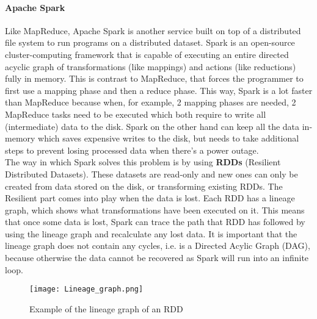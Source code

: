 \paragraph{Apache Spark}
Like MapReduce, Apache Spark is another service built on top of a distributed file system to run programs on a distributed dataset. Spark is an open-source cluster-computing framework that is capable of executing an entire directed acyclic graph of transformations (like mappings) and actions (like reductions) fully in memory\cite{Sparkwebsite}. This is contrast to MapReduce, that forces the programmer to first use a mapping phase and then a reduce phase. This way, Spark is a lot faster than MapReduce because when, for example, 2 mapping phases are needed, 2 MapReduce tasks need to be executed which both require to write all (intermediate) data to the disk. Spark on the other hand can keep all the data in-memory which saves expensive writes to the disk, but needs to take additional steps to prevent losing processed data when there's a power outage.\\

The way in which Spark solves this problem is by using \textbf{RDDs} (Resilient Distributed Datasets). These datasets are read-only and new ones can only be created from data stored on the disk, or transforming existing RDDs\cite{Zaha12}. The Resilient part comes into play when the data is lost. Each RDD has a lineage graph, which shows what transformations have been executed on it. This means that once some data is lost, Spark can trace the path that RDD has followed by using the lineage graph and recalculate any lost data. It is important that the lineage graph does not contain any cycles, i.e. is a Directed Acylic Graph (DAG), because otherwise the data cannot be recovered as Spark will run into an infinite loop.

\begin{figure}
  \begin{center}
    \texttt{[image: Lineage\_graph.png]}
  \end{center}
  \caption{Example of the lineage graph of an RDD\cite{Zaha12}}
  \label{lineagegraph}
\end{figure}
